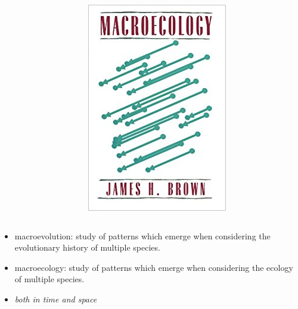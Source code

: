 \documentclass{beamer}
\begin{document}
\begin{frame}
\begin{columns}
\begin{column}{0.5\textwidth}
\begin{center}
      \end{center}
    \end{column}
    \begin{column}{0.5\textwidth}
      \begin{center}
        \includegraphics[height=0.8\textheight,width=\textwidth,keepaspectratio=true]{figure/brown_macro}
      \end{center}
    \end{column}
  \end{columns}
\end{frame}

\begin{frame}
  \begin{definition}
    \begin{itemize}
      \item \alert{macroevolution}: study of patterns which emerge when considering the evolutionary history of multiple species.
      \item \alert{macroecology}: study of patterns which emerge when considering the ecology of multiple species.
      \item \em{both in time and space}
    \end{itemize}
  \end{definition}
\end{frame}
\end{document}
